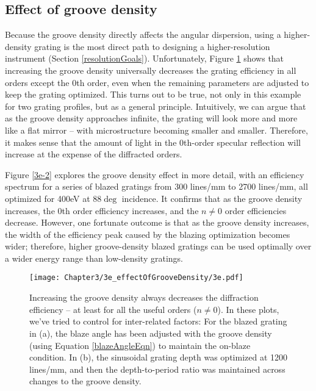 \subsection{Effect of groove density}
Because the groove density directly affects the angular dispersion, using a higher-density grating is the most direct path to designing a higher-resolution instrument (Section \ref{resolutionGoals}).  Unfortunately, Figure \ref{3e} shows that increasing the groove density universally decreases the grating efficiency in all orders except the 0th order, even when the remaining parameters are adjusted to keep the grating optimized.  This turns out to be true, not only in this example for two grating profiles, but as a general principle.  Intuitively, we can argue that as the groove density approaches infinite, the grating will look more and more like a flat mirror -- with microstructure becoming smaller and smaller.  Therefore, it makes sense that the amount of light in the 0th-order specular reflection will increase at the expense of the diffracted orders.

Figure \ref{3e-2} explores the groove density effect in more detail, with an efficiency spectrum for a series of blazed gratings from 300 lines/mm to 2700 lines/mm, all optimized for 400eV at 88$\deg$ incidence.  It confirms that as the groove density increases, the 0th order efficiency increases, and the $n\neq0$ order efficiencies decrease.  However, one fortunate outcome is that as the groove density increases, the width of the efficiency peak caused by the blazing optimization becomes wider; therefore, higher groove-density blazed gratings can be used optimally over a wider energy range than low-density gratings.
	
\begin{figure}[htbp] %
   \centering
   \texttt{[image: Chapter3/3e\_effectOfGrooveDensity/3e.pdf]} 
   \caption{Increasing the groove density always decreases the diffraction efficiency -- at least for all the useful orders ($n \neq 0$).  In these plots, we've tried to control for inter-related factors: For the blazed grating in (a), the blaze angle has been adjusted with the groove density (using Equation \ref{blazeAngleEqn}) to maintain the on-blaze condition.  In (b), the sinusoidal grating depth was optimized at 1200 lines/mm, and then the depth-to-period ratio was maintained across changes to the groove density.}
   \label{3e}
\end{figure}

